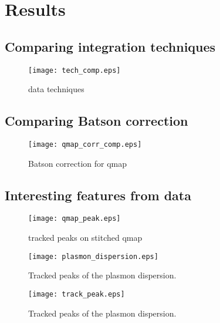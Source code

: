 \section{Results}
\subsection{Comparing integration techniques}

\begin{figure}
	\centering
	\texttt{[image: tech\_comp.eps]}
	\caption{data techniques}
	\label{fig:tech-comp}
\end{figure}



\subsection{Comparing Batson correction}

\begin{figure}
	\centering
	\texttt{[image: qmap\_corr\_comp.eps]}
	\caption{Batson correction for qmap}
	\label{fig:bat-cor}
\end{figure}



\subsection{Interesting features from data}

\begin{figure}
	\centering
	\texttt{[image: qmap\_peak.eps]}
	\caption{tracked peaks on stitched qmap}
	\label{fig:qmap-track}
\end{figure}


\begin{figure}
	\centering
	\texttt{[image: plasmon\_dispersion.eps]}
	\caption{Tracked peaks of the plasmon dispersion.}
	\label{fig:plas_disp}
\end{figure}

\begin{figure}
	\centering
	\texttt{[image: track\_peak.eps]}
	\caption{Tracked peaks of the plasmon dispersion.}
	\label{fig:track_peak}
\end{figure}
